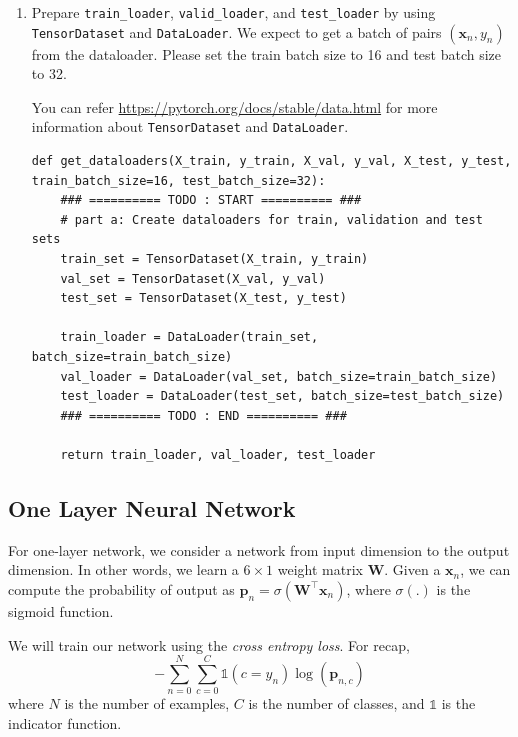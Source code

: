 \begin{enumerate}

\item {} 
Prepare \verb|train_loader|, \verb|valid_loader|, and \verb|test_loader| by using \verb|TensorDataset| and \verb|DataLoader|. We expect to get a batch of pairs $(\mathbf{x}_n, y_n)$ from the dataloader. Please set the train batch size to 16 and test batch size to 32.

You can refer \url{https://pytorch.org/docs/stable/data.html} for more information about \verb|TensorDataset| and \verb|DataLoader|. 

\begin{verbatim}
def get_dataloaders(X_train, y_train, X_val, y_val, X_test, y_test, train_batch_size=16, test_batch_size=32):
    ### ========== TODO : START ========== ###
    # part a: Create dataloaders for train, validation and test sets
    train_set = TensorDataset(X_train, y_train)
    val_set = TensorDataset(X_val, y_val)
    test_set = TensorDataset(X_test, y_test)

    train_loader = DataLoader(train_set, batch_size=train_batch_size)
    val_loader = DataLoader(val_set, batch_size=train_batch_size)
    test_loader = DataLoader(test_set, batch_size=test_batch_size)
    ### ========== TODO : END ========== ###

    return train_loader, val_loader, test_loader    
\end{verbatim}

\end{enumerate}

\subsection{One Layer Neural Network }

For one-layer network, we consider a network from input dimension to the output dimension. In other words, we learn a $6 \times 1$ weight matrix $\mathbf{W}$. Given a $\mathbf{x}_n$, we can compute the probability of output as $\mathbf{p}_n = \sigma(\mathbf{W}^\top \mathbf{x}_n)$, where $\sigma(.)$ is the sigmoid function.

We will train our network using the \emph{cross entropy loss}. For recap,
$$
-\sum_{n=0}^{N} \sum_{c=0}^{C}  \mathds{1}(c=y_n) \log (\mathbf{p}_{n, c})
$$
where $N$ is the number of examples, $C$ is the number of classes, and $\mathds{1}$ is the indicator function.

